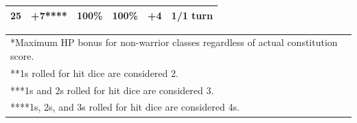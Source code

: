 \begin{minipage}{\columnwidth}
\begin{tabular}{|m{}|m{}|m{}|m{}|m{}|m{}|}
\rowcolor[gray]{.9}25	& +7****	& 100\%	& 100\%	& +4	& 1/1 turn \\
\hline
\end{tabular}
\noindent
\begin{tabular}{p{\textwidth}}
*Maximum HP bonus for non-warrior classes regardless of actual constitution score. \\
**1s rolled for hit dice are considered 2. \\
***1s and 2s rolled for hit dice are considered 3. \\
****1s, 2s, and 3s rolled for hit dice are considered 4s. \\
\end{tabular}\vspace{.5em}

\end{minipage}


